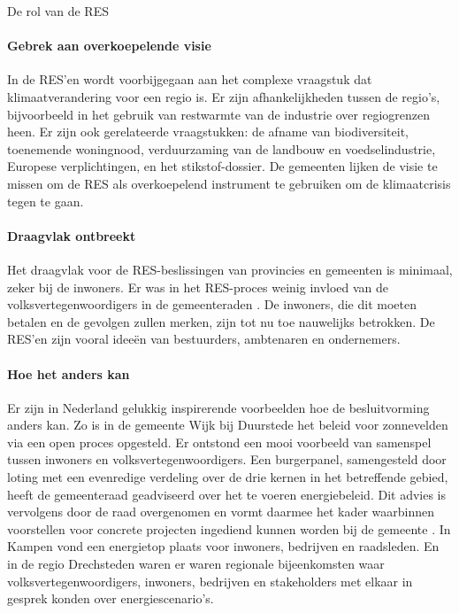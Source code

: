 \begin{voorstel}{De rol van de RES}
\begin{multicols*}{2}
\begin{overwegingen}
\paragraph{Gebrek aan overkoepelende visie}
In de RES’en wordt voorbijgegaan aan het complexe vraagstuk dat klimaatverandering voor een regio is. Er zijn afhankelijkheden tussen de regio’s, bijvoorbeeld in het gebruik van restwarmte van de industrie over regiogrenzen heen. Er zijn ook gerelateerde vraagstukken: de afname van biodiversiteit, toenemende woningnood, verduurzaming van de landbouw en voedselindustrie, Europese verplichtingen, en het stikstof-dossier. De gemeenten lijken de visie te missen om de RES als overkoepelend instrument te gebruiken om de klimaatcrisis tegen te gaan.

\paragraph{Draagvlak ontbreekt}
Het draagvlak voor de RES-beslissingen van provincies en gemeenten is minimaal, zeker bij de inwoners. Er was in het RES-proces weinig invloed van de volksvertegenwoordigers in de gemeenteraden \parencite{prins_eis_2020}. De inwoners, die dit moeten betalen en de gevolgen zullen merken, zijn tot nu toe nauwelijks betrokken. De RES’en zijn vooral ideeën van bestuurders, ambtenaren en ondernemers.

\paragraph{Hoe het anders kan}
Er zijn in Nederland gelukkig inspirerende voorbeelden hoe de besluitvorming anders kan.
Zo is in de gemeente Wijk bij Duurstede het beleid voor zonnevelden via een open proces opgesteld. Er ontstond een mooi voorbeeld van samenspel tussen inwoners en volksvertegenwoordigers. Een burgerpanel, samengesteld door loting met een evenredige verdeling over de drie kernen in het betreffende gebied, heeft de gemeenteraad geadviseerd over het te voeren energiebeleid. Dit advies is vervolgens door de raad overgenomen en vormt daarmee het kader waarbinnen voorstellen voor concrete projecten ingediend kunnen worden bij de gemeente \parencite{burgerpanel_zonnevelden_wijk_bij_duurstede_advies_2019}.
In Kampen vond een energietop plaats voor inwoners, bedrijven en raadsleden. En in de regio Drechsteden waren er waren regionale bijeenkomsten waar volksvertegenwoordigers, inwoners, bedrijven en stakeholders met elkaar in gesprek konden over energiescenario’s.


\end{overwegingen}
\end{multicols*}
\end{voorstel}
